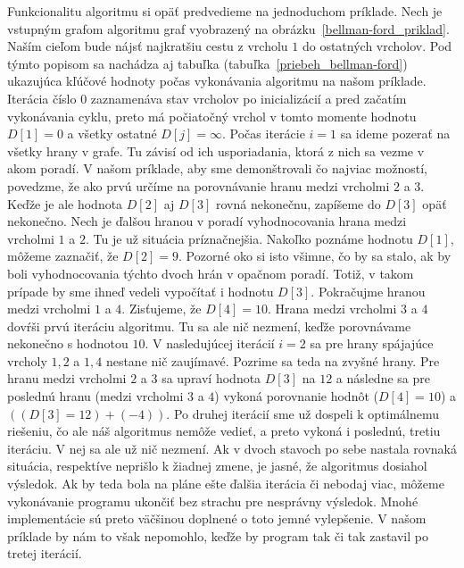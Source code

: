 Funkcionalitu algoritmu si opäť predvedieme na jednoduchom príklade. Nech je vstupným grafom algoritmu graf vyobrazený na obrázku~\ref{bellman-ford_priklad}. Naším cieľom bude nájsť najkratšiu cestu z vrcholu $1$ do ostatných vrcholov. Pod týmto popisom sa nachádza aj tabuľka (tabuľka~\ref{priebeh_bellman-ford}) ukazujúca kľúčové hodnoty počas vykonávania algoritmu na našom príklade. Iterácia číslo 0 zaznamenáva stav vrcholov po inicializácií a pred začatím vykonávania cyklu, preto má počiatočný vrchol v tomto momente hodnotu $D [1] = 0$ a všetky ostatné $D [j] = \infty$. Počas iterácie $i = 1$ sa ideme pozerať na všetky hrany v grafe. Tu závisí od ich usporiadania, ktorá z nich sa vezme v akom poradí. V našom príklade, aby sme demonštrovali čo najviac možností, povedzme, že ako prvú určíme na porovnávanie hranu medzi vrcholmi $2$ a $3$. Keďže je ale hodnota $D[2]$ aj $D[3]$ rovná nekonečnu, zapíšeme do $D[3]$ opäť nekonečno. Nech je ďalšou hranou v poradí vyhodnocovania hrana medzi vrcholmi $1$ a $2$. Tu je už situácia príznačnejšia. Nakoľko poznáme hodnotu $D[1]$, môžeme zaznačiť, že $D[2] = 9$. Pozorné oko si isto všimne, čo by sa stalo, ak by boli vyhodnocovania týchto dvoch hrán v opačnom poradí. Totiž, v takom prípade by sme ihneď vedeli vypočítať i hodnotu $D[3]$. Pokračujme hranou medzi vrcholmi $1$ a $4$. Zisťujeme, že $D[4] = 10$. Hrana medzi vrcholmi $3$ a $4$ dovŕši prvú iteráciu algoritmu. Tu sa ale nič nezmení, keďže porovnávame nekonečno s hodnotou $10$. V nasledujúcej iterácií $i = 2$ sa pre hrany spájajúce vrcholy $1, 2$ a $1, 4$ nestane nič zaujímavé. Pozrime sa teda na zvyšné hrany. Pre hranu medzi vrcholmi $2$ a $3$ sa upraví hodnota $D[3]$ na $12$ a následne sa pre poslednú hranu (medzi vrcholmi $3$ a $4$) vykoná porovnanie hodnôt ($D[4] = 10$) a $((D[3] = 12) + (-4))$. Po druhej iterácií sme už dospeli k optimálnemu riešeniu, čo ale náš algoritmus nemôže vedieť, a preto vykoná i poslednú, tretiu iteráciu. V nej sa ale už nič nezmení. Ak v dvoch stavoch po sebe nastala rovnaká situácia, respektíve neprišlo k žiadnej zmene, je jasné, že algoritmus dosiahol výsledok. Ak by teda bola na pláne ešte ďalšia iterácia či nebodaj viac, môžeme vykonávanie programu ukončiť bez strachu pre nesprávny výsledok. Mnohé implementácie sú preto väčšinou doplnené o toto jemné vylepšenie. V našom príklade by nám to však nepomohlo, keďže by program tak či tak zastavil po tretej iterácií.\newline

